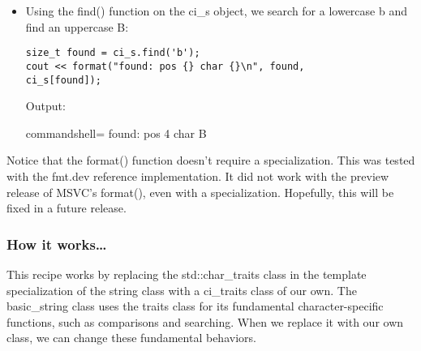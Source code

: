 \begin{itemize}
\begin{lstlisting}[style=styleCXX]
ci_string compare1{"CoMpArE StRiNg"};
ci_string compare2{"compare string"};
if (compare1 == compare2) {
	cout << format("Match! {} == {}\n", compare1,
	compare2);
} else {
	cout << format("no match {} != {}\n", compare1,
	compare2);
}
\end{lstlisting}

Output:

\begin{tcblisting}{commandshell={}}
Match! CoMpArE StRiNg == compare string
\end{tcblisting}

The comparison works as expected.

\item 
Using the find() function on the ci\_s object, we search for a lowercase b and find an uppercase B:

\begin{lstlisting}[style=styleCXX]
size_t found = ci_s.find('b');
cout << format("found: pos {} char {}\n", found,
ci_s[found]);
\end{lstlisting}

Output:

\begin{tcblisting}{commandshell={}}
found: pos 4 char B
\end{tcblisting}
\end{itemize}

\begin{tcolorbox}[colback=webgreen!5!white,colframe=webgreen!75!black,title=Note]
Notice that the format() function doesn't require a specialization. This was tested with the fmt.dev reference implementation. It did not work with the preview release of MSVC's format(), even with a specialization. Hopefully, this will be fixed in a future release.
\end{tcolorbox}

\subsubsection{How it works…}


This recipe works by replacing the std::char\_traits class in the template specialization of the string class with a ci\_traits class of our own. The basic\_string class uses the traits class for its fundamental character-specific functions, such as comparisons and searching. When we replace it with our own class, we can change these fundamental behaviors.

